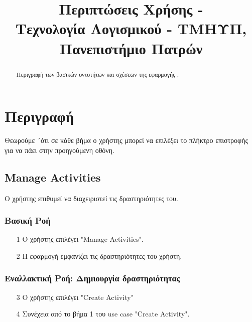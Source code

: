 

\fancyhead[R]{\leftmark}

\title{
    Περιπτώσεις Χρήσης - \appname\\[1ex]
    \large Τεχνολογία Λογισμικού - ΤΜΗΥΠ, Πανεπιστήμιο Πατρών \\[2ex]
}



\maketitle
\thispagestyle{empty}
\newpage

\tableofcontents
\newpage

\begin{abstract}
    Περιγραφή των βασικών οντοτήτων και σχέσεων της εφαρμογής \appname,
\end{abstract}

\newpage

\section{Περιγραφή}

Θεωρούμε ´ότι σε κάθε βήμα ο χρήστης μπορεί να επιλέξει το πλήκτρο επιστροφής
για να πάει στην προηγούμενη οθόνη.

\subsection{Manage Activities}

Ο χρήστης επιθυμεί να διαχειριστεί τις δραστηριότητες του.

\subsubsection{Βασική Ροή}

\begin{enumerate}
    \item[1] Ο χρήστης επιλέγει "Manage Activities".
    \item[2] Η εφαρμογή εμφανίζει τις δραστηριότητες του χρήστη.
\end{enumerate}

\subsubsection{Εναλλακτική Ροή: Δημιουργία δραστηριότητας}

\begin{enumerate}
    \item[3] Ο χρήστης επιλέγει "Create Activity"
    \item[4] Συνέχεια από το βήμα 1 του use case "Create Activity".
\end{enumerate}

